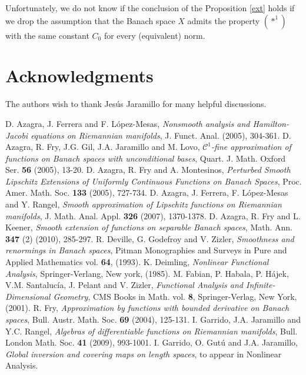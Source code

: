 \documentclass[11pt]{amsart}
\numberwithin{equation}{section}
\begin{document}
 Unfortunately, we do not know if the conclusion of the Proposition \ref{ext} holds if we drop the assumption that the Banach space $X$ admits the property $(*^1)$ with the same constant $C_0$ for every (equivalent) norm.

 
 

\section*{Acknowledgments}
The authors wish to thank Jes\'us Jaramillo for many helpful discussions.

\begin{thebibliography}{998}
 D. Azagra, J. Ferrera and F. L\'opez-Mesas, \emph{Nonsmooth analysis and Hamilton-Jacobi equations on Riemannian manifolds}, J. Funct. Anal.  (2005), 304-361.
 D. Azagra, R. Fry, J.G. Gil, J.A. Jaramillo and M. Lovo, \emph{$\mathcal{C}^{1}$-fine approximation of functions on Banach spaces with unconditional bases}, Quart. J. Math. Oxford Ser. \textbf{56} (2005), 13-20.
 D. Azagra, R. Fry and A. Montesinos, \emph{Perturbed Smooth Lipschitz Extensions of Uniformly Continuous Functions on Banach Spaces}, Proc. Amer. Math. Soc. \textbf{133} (2005), 727-734.
 D. Azagra, J. Ferrera, F. L\'opez-Mesas and Y. Rangel, \emph{Smooth approximation of Lipschitz functions on Riemannian manifolds}, J. Math. Anal. Appl. \textbf{326} (2007), 1370-1378.
 D. Azagra, R. Fry and L. Keener, \emph{Smooth extension of functions on separable Banach spaces}, Math. Ann. \textbf{347}  (2) (2010), 285-297.
 R. Deville, G. Godefroy and V. Zizler, \emph{Smoothness and renormings in Banach spaces}, Pitman Monographies and Surveys in Pure and Applied Mathematics vol. \textbf{64}, (1993).
 K. Deimling, \emph{Nonlinear Functional Analysis}, Springer-Verlang, New york, (1985).
 M. Fabian, P. Habala, P. H\'ajek, V.M. Santaluc\'ia, J. Pelant and V. Zizler, \emph{Functional Analysis and Infinite-Dimensional Geometry}, CMS Books in Math. vol. \textbf{8}, Springer-Verlag, New York, (2001).
 R. Fry, \emph{Approximation by functions with bounded derivative on Banach spaces}, Bull. Austr. Math. Soc. \textbf{69} (2004), 125-131.
 I. Garrido, J.A. Jaramillo and Y.C. Rangel, \emph{Algebras of differentiable functions on Riemannian manifolds}, Bull. London Math. Soc. \textbf{41} (2009), 993-1001.
I. Garrido, O. Gut\'u and J.A. Jaramillo, \emph{Global inversion and covering maps on length spaces}, to appear in Nonlinear Analysis.

\end{thebibliography}
\end{document}
